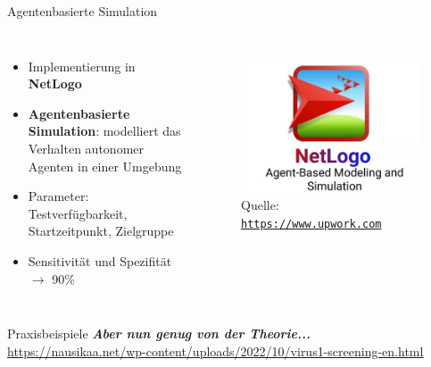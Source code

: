 \documentclass[ngerman,14pt,aspectratio=1610]{beamer}
\begin{document}
	\begin{frame}[t]{Agentenbasierte Simulation} \vspace{30pt}		
		\begin{columns}[T, onlytextwidth]
			\begin{itemize}
				\item Implementierung in  \textbf{NetLogo}
				\item  \textbf{Agentenbasierte Simulation}: modelliert das Verhalten autonomer Agenten in einer Umgebung
				\item Parameter: Testverfügbarkeit, Startzeitpunkt, Zielgruppe
				\item Sensitivität und Spezifität $\rightarrow$ 90\%
			\end{itemize}
			
			\begin{figure}[h]
				\centering
				\includegraphics[width=\linewidth]{netlogo}
				\tiny Quelle: \href{https://www.upwork.com/services/product/development-it-a-netlogo-agent-based-simulation-model-1351194777425215488}{\texttt{https://www.upwork.com}}
			\end{figure}
			
		\end{columns}
	\end{frame}
	
	\begin{frame}[t]{Praxisbeispiele} \vspace{60pt}
		\textbf{\textit{Aber nun genug von der Theorie...}}\\
		\bigskip
		\url{https://nausikaa.net/wp-content/uploads/2022/10/virus1-screening-en.html}
	\end{frame}
	
\end{document}
